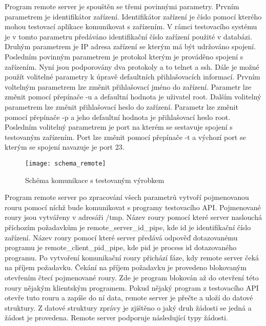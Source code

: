 Program remote server je spouštěn se třemi povinnými parametry. Prvním parametrem je identifikátor zařízení. Identifikátor zařízení je číslo pomocí kterého mohou testovací aplikace komunikovat s zařízením. V rámci testovacího systému je v tomto parametru předáváno identifikační číslo zařízení použité v databázi. Druhým parametrem je IP adresa zařízení se kterým má být udržováno spojení. Posledním povinným parametrem je protokol kterým je prováděno spojení s zařízením. Nyní jsou podporovány dva protokoly a to telnet a ssh. Dále je možné použít volitelné parametry k úpravě defaultních přihlašovacích informací. Prvním voltelným parametrem lze změnit přihlašovací jméno do zařízení. Parametr lze změnit pomocí přepínače -u a defaultní hodnota je uživatel root. Dalším volitelný parametrem lze změnit přihlašovací heslo do zařízení. Parametr lze změnit pomocí přepínače -p a jeho defaultní hodnota je přihlašovací heslo root. Posledním volitelný parametrem je port na kterém se sestavuje spojení s testovaným zařízením. Port lze změnit pomocí přepínače -t a výchozí port se kterým se spojení navazuje je port 23.

\begin{figure}[h]
  \centering
  \texttt{[image: schema\_remote]}
  \caption{Schéma komunikace s testovaným výrobkem}
  \label{fig:schema_remote}
\end{figure}

Program remote server po zpracování všech parametrů vytvoří pojmenovanou rouru pomocí níchž bude komunikovat s programy testovacího API. Pojmenované roury jsou vytvářeny v adresáři /tmp. Název roury pomocí které server naslouchá příchozím požadavkům je remote\_server\_id\_pipe, kde id je identifikační číslo zařízení. Název roury pomocí které server předává odpověď dotazovanému programu je remote\_client\_pid\_pipe, kde pid je process id dotazovaného programu. Po vytvoření komunikační roury přichází fáze, kdy remote server čeká na příjem požadavku. Čekání na příjem požadavku je provedeno blokovaným otevřením čtecí pojmenované roury. Zde je program blokován až do otevření této roury nějakým klientským programem. Pokud nějaký program z testovacího API otevře tuto rouru a zapíše do ní data, remote server je přečte a uloží do datové struktury. Z datové struktury zprávy je zjištěno o jaký druh žádosti se jedná a žádost je provedena. Remote server podporuje následující typy žádosti.


